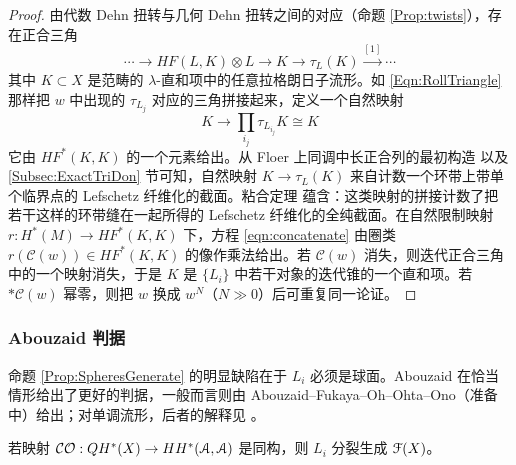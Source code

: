 \begin{proof}
由代数 Dehn 扭转与几何 Dehn 扭转之间的对应（命题 \ref{Prop:twists}），存在正合三角
\[
\cdots \rightarrow  HF(L,K)\otimes L \rightarrow K \rightarrow \tau_L(K) \stackrel{[1]}{\longrightarrow} \cdots
\]
其中 $K \subset X$ 是范畴的 $\lambda$-直和项中的任意拉格朗日子流形。如 \eqref{Eqn:RollTriangle} 那样把 $w$ 中出现的 $\tau_{L_j}$ 对应的三角拼接起来，定义一个自然映射
\begin{equation}\label{eqn:concatenate}
K \rightarrow \prod_{i_j} \tau_{L_{i_j}} K \cong K
\end{equation}
它由 $HF^*(K,K)$ 的一个元素给出。从 Floer 上同调中长正合列的最初构造 \cite{Seidel:LES} 以及 \ref{Subsec:ExactTriDon} 节可知，自然映射 $K \rightarrow \tau_L(K)$ 来自计数一个环带上带单个临界点的 Lefschetz 纤维化的截面。粘合定理 \cite[Proposition 2.22]{Seidel:LES} 蕴含：这类映射的拼接计数了把若干这样的环带缝在一起所得的 Lefschetz 纤维化的全纯截面。在自然限制映射 $r: H^{*}(M) \rightarrow HF^{*}(K,K)$ 下，方程 \ref{eqn:concatenate} 由圈类 $r(\mathcal{C}(w)) \in HF^{*}(K,K)$ 的像作乘法给出。若 $\mathcal{C}(w)$ 消失，则迭代正合三角中的一个映射消失，于是 $K$ 是 $\{L_i\}$ 中若干对象的迭代锥的一个直和项。若 $\ast \mathcal{C}(w)$ 幂零，则把 $w$ 换成 $w^N$（$N \gg 0$）后可重复同一论证。
\end{proof}

\subsubsection{Abouzaid 判据}

命题 \ref{Prop:SpheresGenerate} 的明显缺陷在于 $L_i$ 必须是球面。Abouzaid \cite{Abouzaid:generation} 在恰当情形给出了更好的判据，一般而言则由 Abouzaid--Fukaya--Oh--Ohta--Ono（准备中）给出；对单调流形，后者的解释见 \cite{RitterSmith, Sheridan3}。

\begin{Theorem} \label{Thm:AFOOOgenerate}\label{Thm:Generation}
若映射 $\mathcal{CO}: QH^*(X) \rightarrow HH^*(\EuScript{A},\EuScript{A})$ 是同构，则 $L_i$ 分裂生成 $\EuScript{F}(X)$。
\end{Theorem}

